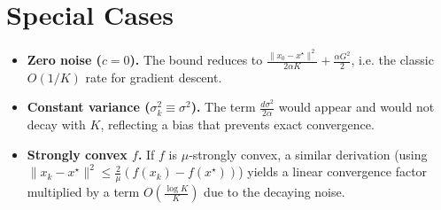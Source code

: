 \documentclass{article}
\begin{document}
\section*{Special Cases}
\begin{itemize}
\item \textbf{Zero noise ($c=0$).} The bound reduces to $\frac{\|x_{0}-x^{\star}\|^{2}}{2\alpha K}+\frac{\alpha G^{2}}{2}$, i.e. the classic $O(1/K)$ rate for gradient descent.
\item \textbf{Constant variance ($\sigma_k^{2}\equiv\sigma^{2}$).} The term $\frac{d\sigma^{2}}{2\alpha}$ would appear and would not decay with $K$, reflecting a bias that prevents exact convergence.
\item \textbf{Strongly convex $f$.} If $f$ is $\mu$‑strongly convex, a similar derivation (using $\|x_k-x^{\star}\|^{2}\le \frac{2}{\mu}(f(x_k)-f(x^{\star}))$) yields a linear convergence factor multiplied by a term $O(\frac{\log K}{K})$ due to the decaying noise.
\end{itemize}
\end{document}
